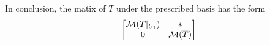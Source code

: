 In conclusion, the matix of $T$ under the prescribed basis has the form
\[
    \begin{bmatrix}
        {\cal M}(T|_{U_1}) & * \\
        0 & {\cal M}(\overline{T})
    \end{bmatrix}
\]







